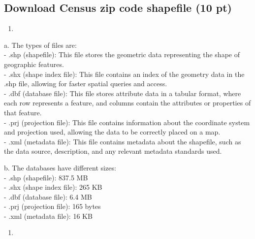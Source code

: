 \documentclass[
  letterpaper,
  DIV=11,
  numbers=noendperiod]{scrartcl}
\providecommand{\tightlist}{%
  \setlength{\itemsep}{0pt}\setlength{\parskip}{0pt}}\usepackage{longtable,booktabs,array}
\begin{document}
\subsection{Download Census zip code shapefile (10
pt)}\label{download-census-zip-code-shapefile-10-pt}

\begin{enumerate}
\def\labelenumi{\arabic{enumi}.}
\tightlist
\item
\end{enumerate}

\hfill\break
a. The types of files are:\\
- .shp (shapefile): This file stores the geometric data representing the
shape of geographic features.\\
- .shx (shape index file): This file contains an index of the geometry
data in the .shp file, allowing for faster spatial queries and access.\\
- .dbf (database file): This file stores attribute data in a tabular
format, where each row represents a feature, and columns contain the
attributes or properties of that feature.\\
- .prj (projection file): This file contains information about the
coordinate system and projection used, allowing the data to be correctly
placed on a map.\\
- .xml (metadata file): This file contains metadata about the shapefile,
such as the data source, description, and any relevant metadata
standards used.

\hfill\break
b. The databases have different sizes:\\
- .shp (shapefile): 837.5 MB\\
- .shx (shape index file): 265 KB\\
- .dbf (database file): 6.4 MB\\
- .prj (projection file): 165 bytes\\
- .xml (metadata file): 16 KB\\

\begin{enumerate}
\def\labelenumi{\arabic{enumi}.}
\setcounter{enumi}{1}
\tightlist
\item
\end{enumerate}
\end{document}
